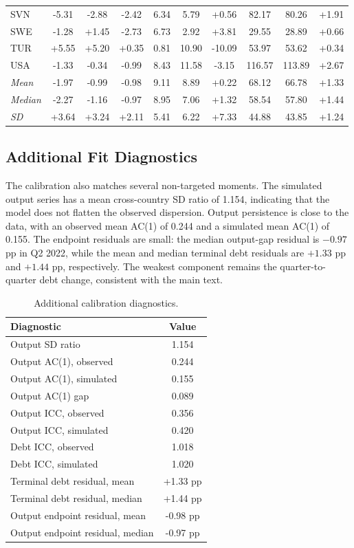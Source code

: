 \documentclass[12pt, a4paper]{article}
\begin{document}
\begin{longtable}{lccccccccc}
SVN & -5.31 & -2.88 & -2.42 & 6.34 & 5.79 & +0.56 & 82.17 & 80.26 & +1.91 \\
SWE & -1.28 & +1.45 & -2.73 & 6.73 & 2.92 & +3.81 & 29.55 & 28.89 & +0.66 \\
TUR & +5.55 & +5.20 & +0.35 & 0.81 & 10.90 & -10.09 & 53.97 & 53.62 & +0.34 \\
USA & -1.33 & -0.34 & -0.99 & 8.43 & 11.58 & -3.15 & 116.57 & 113.89 & +2.67 \\
\midrule
\textit{Mean} & -1.97 & -0.99 & -0.98 & 9.11 & 8.89 & +0.22 & 68.12 & 66.78 & +1.33 \\
\textit{Median} & -2.27 & -1.16 & -0.97 & 8.95 & 7.06 & +1.32 & 58.54 & 57.80 & +1.44 \\
\textit{SD} & +3.64 & +3.24 & +2.11 & 5.41 & 6.22 & +7.33 & 44.88 & 43.85 & +1.24 \\
\end{longtable}



\subsection{Additional Fit Diagnostics}

The calibration also matches several non-targeted moments. The simulated output series has a mean cross-country SD ratio of 1.154, indicating that the model does not flatten the observed dispersion. Output persistence is close to the data, with an observed mean AC(1) of 0.244 and a simulated mean AC(1) of 0.155. The endpoint residuals are small: the median output-gap residual is $-0.97$ pp in Q2 2022, while the mean and median terminal debt residuals are $+1.33$ pp and $+1.44$ pp, respectively. The weakest component remains the quarter-to-quarter debt change, consistent with the main text.

\begin{table}[H]
\centering
\caption{Additional calibration diagnostics.}
\label{tab:additional_calib_diagnostics}
\scriptsize
\begin{tabular}{lc}
\toprule
\textbf{Diagnostic} & \textbf{Value} \\
\midrule
Output SD ratio & 1.154 \\
Output AC(1), observed & 0.244 \\
Output AC(1), simulated & 0.155 \\
Output AC(1) gap & 0.089 \\
Output ICC, observed & 0.356 \\
Output ICC, simulated & 0.420 \\
Debt ICC, observed & 1.018 \\
Debt ICC, simulated & 1.020 \\
Terminal debt residual, mean & +1.33 pp \\
Terminal debt residual, median & +1.44 pp \\
Output endpoint residual, mean & -0.98 pp \\
Output endpoint residual, median & -0.97 pp \\
\bottomrule
\end{tabular}
\end{table}
\end{document}

